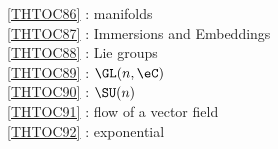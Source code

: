 \ref {THTOC86} : manifolds\\
\ref {THTOC87} : Immersions and Embeddings\\
\ref {THTOC88} : Lie groups\\
\ref {THTOC89} : \( \GL (n,\eC )\)\\
\ref {THTOC90} : \( \SU (n)\)\\
\ref {THTOC91} : flow of a vector field\\
\ref {THTOC92} : exponential\\
